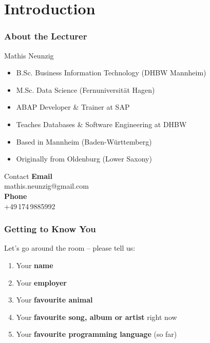 \section{Introduction}

\begin{frame}
  \frametitle{About the Lecturer}

  \begin{block}{Mathis Neunzig}
    \begin{itemize}
      \item B.Sc. Business Information Technology (DHBW Mannheim)
      \item M.Sc. Data Science (Fernuniversität Hagen)
      \item ABAP Developer \& Trainer at SAP
      \item Teaches Databases \& Software Engineering at DHBW
      \item Based in Mannheim (Baden-Württemberg)
      \item Originally from Oldenburg (Lower Saxony)
    \end{itemize}
  \end{block}

  \begin{block}{Contact}
    \footnotesize
    \textbf{Email}\\
    mathis.neunzig@gmail.com\\[6pt]
    \textbf{Phone}\\
    +49\,174\,9885992
  \end{block}
\end{frame}

\begin{frame}
  \frametitle{Getting to Know You}

  \begin{block}{Let's go around the room -- please tell us:}
    \begin{enumerate}
      \item Your \textbf{name}
      \item Your \textbf{employer}
      \item Your \textbf{favourite animal}
      \item Your \textbf{favourite song, album or artist} right now
      \item Your \textbf{favourite programming language} (so far)
    \end{enumerate}
  \end{block}
\end{frame}


